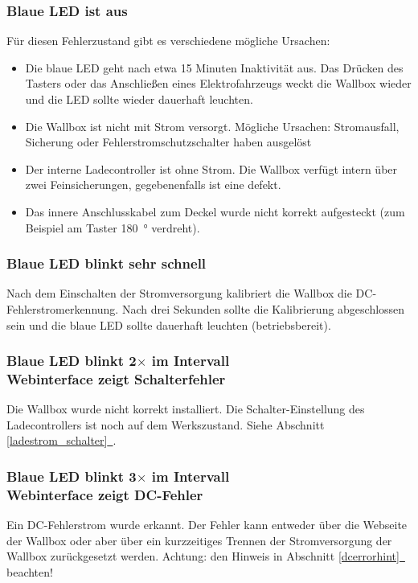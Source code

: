 \documentclass[a4paper,10pt]{article}
\newcommand*{\fullref}[1]{Abschnitt \hyperref[{#1}]{\ref*{#1}~\nameref*{#1}}}
\begin{document}
\begin{multicols*}{2}
    \subsubsection*{Blaue LED ist aus}
    Für diesen Fehlerzustand gibt es verschiedene mögliche Ursachen:
    \begin{itemize}
        \item Die blaue LED geht nach etwa 15 Minuten Inaktivität aus. Das Drücken des Tasters
              oder das Anschließen eines Elektrofahrzeugs weckt die Wallbox wieder
              und die LED sollte wieder dauerhaft leuchten.
        \item Die Wallbox ist nicht mit Strom versorgt. Mögliche Ursachen: Stromausfall,
              Sicherung oder Fehlerstrom\-schutzschalter haben ausgelöst
        \item Der interne Ladecontroller ist ohne Strom. Die Wallbox verfügt intern über zwei
              Feinsicherungen, gegebenenfalls ist eine defekt.
        \item Das innere Anschlusskabel zum Deckel wurde nicht korrekt aufgesteckt (zum Beispiel am Taster \SI{180}{\degree} verdreht).
    \end{itemize}

    \subsubsection*{Blaue LED blinkt sehr schnell}\label{fast_blink}
    Nach dem Einschalten der Stromversorgung kalibriert die Wallbox die
    DC-Fehlerstromerkennung. Nach drei Sekunden sollte die Kalibrierung
    abgeschlossen sein und die blaue LED sollte dauerhaft leuchten
    (betriebsbereit).

    \subsubsection*{Blaue LED blinkt 2$\times$ im Intervall \\ Webinterface zeigt Schalterfehler}
    Die Wallbox wurde nicht korrekt installiert. Die Schalter-Einstellung des Ladecontrollers ist
    noch auf dem Werkszustand. Siehe \fullref{ladestrom_schalter}.

    \begin{minipage}{\linewidth} %
        \subsubsection*{Blaue LED blinkt 3$\times$ im Intervall \\ Webinterface zeigt DC-Fehler}
        Ein DC-Fehlerstrom wurde erkannt. Der Fehler kann entweder über die Webseite der Wallbox oder aber über
        ein kurzzeitiges Trennen der Stromversorgung der Wallbox zurückgesetzt
        werden. Achtung: den Hinweis in \fullref{dcerrorhint} beachten!
    \end{minipage}


\end{multicols*}
\end{document}
